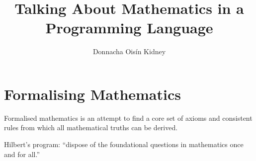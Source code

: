 \documentclass[usenames,dvipsnames]{beamer}
\title{Talking About Mathematics in a Programming Language}
\author{Donnacha Oisín Kidney}
\begin{document}
\maketitle
\tableofcontents

\section{Formalising Mathematics}
\begin{frame}
  Formalised mathematics is an attempt to find a core set of axioms and
  consistent rules from which all mathematical truths can be derived.


  Hilbert's program: ``dispose of the foundational questions in mathematics once
  and for all.''
\end{frame}
\end{document}
